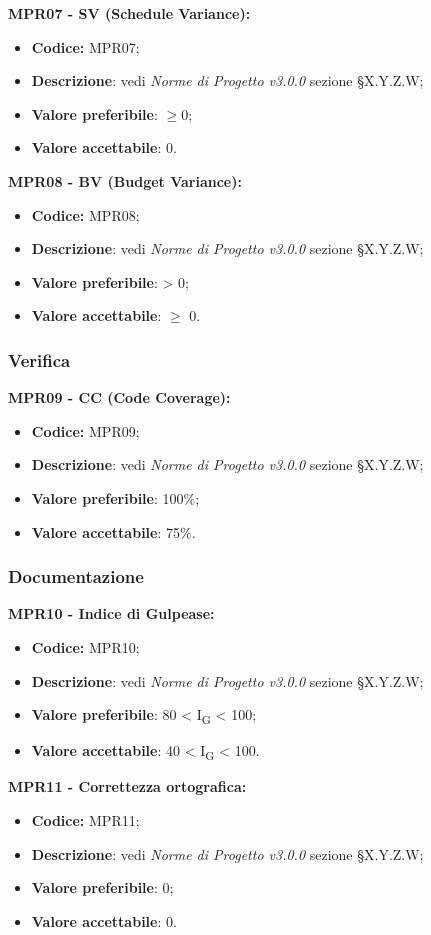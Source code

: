 \textbf{MPR07 - SV (Schedule Variance):}
\begin{itemize}
    \item \textbf{Codice:} MPR07;
    \item \textbf{Descrizione}: vedi \textit{Norme di Progetto v3.0.0} sezione \S X.Y.Z.W;
    \item \textbf{Valore preferibile}: $\geq 0$;
    \item \textbf{Valore accettabile}: 0.
\end{itemize}
\textbf{MPR08 - BV (Budget Variance):}
\begin{itemize}
    \item \textbf{Codice:} MPR08;
    \item \textbf{Descrizione}: vedi \textit{Norme di Progetto v3.0.0} sezione \S X.Y.Z.W;
    \item \textbf{Valore preferibile}: > 0;
    \item \textbf{Valore accettabile}: $\geq$ 0.
\end{itemize}
\subsubsection{Verifica}
\textbf{MPR09 - CC (Code Coverage):}
\begin{itemize}
    \item \textbf{Codice:} MPR09;
    \item \textbf{Descrizione}: vedi \textit{Norme di Progetto v3.0.0} sezione \S X.Y.Z.W;
    \item \textbf{Valore preferibile}: 100\%;
    \item \textbf{Valore accettabile}: 75\%.
\end{itemize}
\subsubsection{Documentazione}
\textbf{MPR10 - Indice di Gulpease:}
\begin{itemize}
    \item \textbf{Codice:} MPR10;
    \item \textbf{Descrizione}: vedi \textit{Norme di Progetto v3.0.0} sezione \S X.Y.Z.W;
    \item \textbf{Valore preferibile}: 80 < I\textsubscript{G} < 100;
    \item \textbf{Valore accettabile}: 40 < I\textsubscript{G} < 100.
\end{itemize}
\textbf{MPR11 - Correttezza ortografica:}
\begin{itemize}
    \item \textbf{Codice:} MPR11;
    \item \textbf{Descrizione}: vedi \textit{Norme di Progetto v3.0.0} sezione \S X.Y.Z.W;
    \item \textbf{Valore preferibile}: 0;
    \item \textbf{Valore accettabile}: 0.
\end{itemize}
